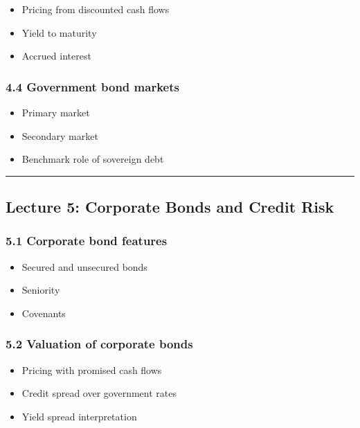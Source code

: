 \documentclass[
  letterpaper,
  DIV=11,
  numbers=noendperiod]{scrartcl}
\providecommand{\tightlist}{%
  \setlength{\itemsep}{0pt}\setlength{\parskip}{0pt}}
\begin{document}
\begin{itemize}
\tightlist
\item
  Pricing from discounted cash flows
\item
  Yield to maturity
\item
  Accrued interest
\end{itemize}

\subsubsection{4.4 Government bond
markets}\label{government-bond-markets}

\begin{itemize}
\tightlist
\item
  Primary market
\item
  Secondary market
\item
  Benchmark role of sovereign debt
\end{itemize}

\begin{center}\rule{0.5\linewidth}{0.5pt}\end{center}

\subsection{Lecture 5: Corporate Bonds and Credit
Risk}\label{lecture-5-corporate-bonds-and-credit-risk}

\subsubsection{5.1 Corporate bond
features}\label{corporate-bond-features}

\begin{itemize}
\tightlist
\item
  Secured and unsecured bonds
\item
  Seniority
\item
  Covenants
\end{itemize}

\subsubsection{5.2 Valuation of corporate
bonds}\label{valuation-of-corporate-bonds}

\begin{itemize}
\tightlist
\item
  Pricing with promised cash flows
\item
  Credit spread over government rates
\item
  Yield spread interpretation
\end{itemize}
\end{document}
